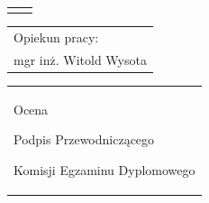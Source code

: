 \begin{titlepage}
{\begin{center}
	\vspace*{7\baselineskip}
	\hfill\mbox{}\par\vspace*{\baselineskip}\noindent
	\begin{tabular}[b]{@{}p{3cm}@{\ }l@{}}
	    {\large\hfill } & {\large }
	\end{tabular}
	\hfill
	\begin{tabular}[b]{@{}l@{}}
	Opiekun pracy: \\[\smallskipamount]
	{\large mgr inż. Witold Wysota}
	\end{tabular}\par
	\vspace*{4\baselineskip}
    \begin{tabular}{p{\textwidth}}
    \begin{flushleft}
	\begin{minipage}{7cm}
	Ocena \dotfill
	\par\vspace{1.6\baselineskip}
	\dotfill
	\par\noindent
	\centerline{\footnotesize Podpis Przewodniczącego} \par
	\centerline{\footnotesize Komisji Egzaminu Dyplomowego}\par
	\end{minipage}
    \end{flushleft}
    \end{tabular}
    \end{center}}


\end{titlepage}
